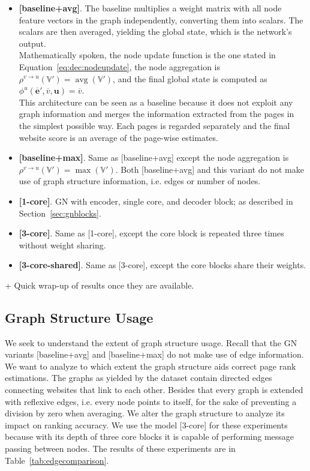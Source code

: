 \begin{itemize}
    \item \textbf{[baseline+avg]}. The baseline multiplies a weight matrix with all node feature vectors in the graph independently, converting them into scalars. The scalars are then averaged, yielding the global state, which is the network's output.\\
    Mathematically spoken, the node update function is the one stated in Equation~\ref{eq:dec:nodeupdate}, the node aggregation is $\rho^{v\rightarrow u}\left(\mathbb{V}'\right)=\operatorname{avg}\left(\mathbb{V}'\right)$, and the final global state is computed as $\phi^u\left(\bm{\overline{e}}',\overline{v},\bm{u}\right)=\overline{v}$.\\
    This architecture can be seen as a baseline because it does not exploit any graph information and merges the information extracted from the pages in the simplest possible way. Each pages is regarded separately and the final website score is an average of the page-wise estimates.
    \item \textbf{[baseline+max]}. Same as [baseline+avg] except the node aggregation is $\rho^{v\rightarrow u}\left(\mathbb{V}'\right)=\operatorname{max}\left(\mathbb{V}'\right)$. Both [baseline+avg] and this variant do not make use of graph structure information, i.e. edges or number of nodes.
    \item \textbf{[1-core]}. GN with encoder, single core, and decoder block; as described in Section~\ref{sec:gnblocks}.
    \item \textbf{[3-core]}. Same as [1-core], except the core block is repeated three times without weight sharing.
    \item \textbf{[3-core-shared]}. Same as [3-core], except the core blocks share their weights.
\end{itemize}

+ Quick wrap-up of results once they are available.

\subsection{Graph Structure Usage}

We seek to understand the extent of graph structure usage. Recall that the GN variants [baseline+avg] and [baseline+max] do not make use of edge information. We want to analyze to which extent the graph structure aids correct page rank estimations. The graphs as yielded by the dataset contain directed edges connecting websites that link to each other. Besides that every graph is extended with reflexive edges, i.e. every node points to itself, for the sake of preventing a division by zero when averaging. We alter the graph structure to analyze its impact on ranking accuracy. We use the model [3-core] for these experiments because with its depth of three core blocks it is capable of performing message passing between nodes. The results of these experiments are in Table~\ref{tab:edgecomparison}.

